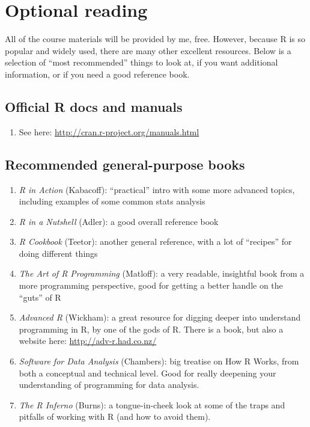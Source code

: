 \documentclass{tufte-handout}
\begin{document}
\section*{Optional reading}
\label{sec-7}

All of the course materials will be provided by me, free. However, because R is so popular and widely used, there are many other excellent resources.  Below is a selection of ``most recommended'' things to look at, if you want additional information, or if you need a good reference book.

\newpage
\subsection*{Official R docs and manuals}
\label{sec-7-1}

\begin{enumerate}
\item See here: \href{http://cran.r-project.org/manuals.html}{http://cran.r-project.org/manuals.html}
\end{enumerate}
\subsection*{Recommended general-purpose books}
\label{sec-7-2}

\begin{enumerate}
\item \emph{R in Action} (Kabacoff): ``practical'' intro with some more advanced topics, including examples of some common stats analysis
\item \emph{R in a Nutshell} (Adler): a good overall reference book
\item \emph{R Cookbook} (Teetor): another general reference, with a lot of ``recipes'' for doing different things
\item \emph{The Art of R Programming} (Matloff): a very readable, insightful book from a more programming perspective, good for getting a better handle on the ``guts'' of R
\item \emph{Advanced R} (Wickham): a great resource for digging deeper into understand programming in R, by one of the gods of R. There is a book, but also a website here: \href{http://adv-r.had.co.nz/}{http://adv-r.had.co.nz/}
\item \emph{Software for Data Analysis} (Chambers): big treatise on How R Works, from both a conceptual and technical level. Good for really deepening your understanding of programming for data analysis.
\item \emph{The R Inferno} (Burns): a tongue-in-cheek look at some of the traps and pitfalls of working with R (and how to avoid them).
\end{enumerate}
\end{document}
